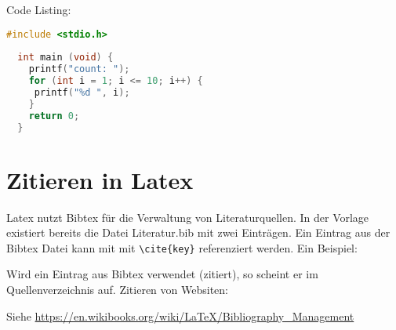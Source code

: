 Code Listing:
\begin{lstlisting}[language=C++,caption=Example Code	]
  #include <stdio.h>
  
  int main (void) {
    printf("count: ");
    for (int i = 1; i <= 10; i++) {
     printf("%d ", i);
    }
    return 0;
  }
\end{lstlisting}


% 
%   
% 
% 
%   



\section{Zitieren in Latex}
Latex nutzt Bibtex für die Verwaltung von Literaturquellen. In der Vorlage existiert bereits die Datei Literatur.bib mit zwei Einträgen. Ein Eintrag aus der Bibtex Datei kann mit mit \verb|\cite{key}| referenziert werden. Ein Beispiel: \cite{flegel}

Wird ein Eintrag aus Bibtex verwendet (zitiert), so scheint er im Quellenverzeichnis auf.
Zitieren von Websiten: \cite{htlwels}

Siehe \url{https://en.wikibooks.org/wiki/LaTeX/Bibliography_Management}
